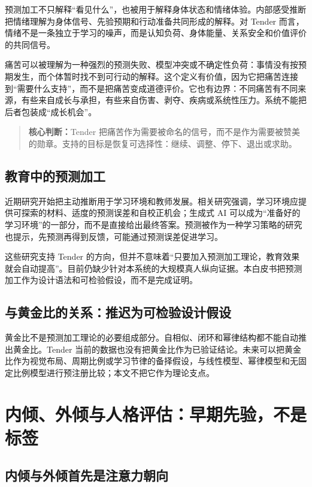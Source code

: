 \documentclass[UTF8,a4paper,11pt]{ctexart}
\newcommand{\keypoint}[1]{\begin{quote}\noindent\textbf{\color{TenderBlue}核心判断：}#1\end{quote}}
\begin{document}
预测加工不只解释“看见什么”，也被用于解释身体状态和情绪体验。内部感受推断把情绪理解为身体信号、先验预期和行动准备共同形成的解释\cite{Seth2013}。对 Tender 而言，情绪不是一条独立于学习的噪声，而是认知负荷、身体能量、关系安全和价值评价的共同信号。

痛苦可以被理解为一种强烈的预测失败、模型冲突或不确定性负荷：事情没有按预期发生，而个体暂时找不到可行动的解释。这个定义有价值，因为它把痛苦连接到“需要什么支持”，而不是把痛苦变成道德评价。它也有边界：不同痛苦有不同来源，有些来自成长与承担，有些来自伤害、剥夺、疾病或系统性压力。系统不能把后者包装成“成长机会”。

\keypoint{Tender 把痛苦作为需要被命名的信号，而不是作为需要被赞美的勋章。支持的目标是恢复可选择性：继续、调整、停下、退出或求助。}

\subsection{教育中的预测加工}

近期研究开始把主动推断用于学习环境和教师发展。相关研究强调，学习环境应提供可探索的材料、适度的预测误差和自校正机会；生成式 AI 可以成为“准备好的学习环境”的一部分，而不是直接给出最终答案\cite{ActiveInferenceSchool2024,TeacherDevelopment2026}。预测被作为一种学习策略的研究也提示，先预测再得到反馈，可能通过预测误差促进学习\cite{Brod2021}。

这些研究支持 Tender 的方向，但并不意味着“只要加入预测加工理论，教育效果就会自动提高”。目前仍缺少针对本系统的大规模真人纵向证据。本白皮书把预测加工作为设计语法和可检验假设，而不是完成证明。

\subsection{与黄金比的关系：推迟为可检验设计假设}

黄金比不是预测加工理论的必要组成部分。自相似、闭环和幂律结构都不能自动推出黄金比。Tender 当前的数据也没有把黄金比作为已验证结论。未来可以把黄金比作为视觉布局、周期比例或学习节律的备择假设，与线性模型、幂律模型和无固定比例模型进行预注册比较；本文不把它作为理论支点。

\newpage

\section{内倾、外倾与人格评估：早期先验，不是标签}

\subsection{内倾与外倾首先是注意力朝向}
\end{document}
